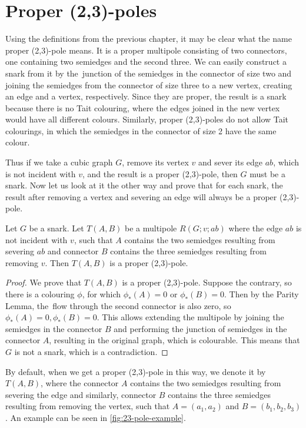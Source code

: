 \section{Proper (2,3)-poles}\label{ch:proper-23-poles}

Using the definitions from the previous chapter, it may be clear what the name proper (2,3)-pole means. It is a proper multipole consisting of two connectors, one containing two semiedges and the second three. We can easily construct a snark from it by the~junction of the semiedges in the connector of size two and joining the semiedges from the connector of size three to a new vertex, creating an edge and a vertex, respectively. Since they are proper, the result is a snark because there is no Tait colouring, where the edges joined in the new vertex would have all different colours. Similarly, proper (2,3)-poles do not allow Tait colourings, in which the semiedges in the connector of size 2 have the same colour.

Thus if we take a cubic graph $G$, remove its vertex $v$ and sever its edge $ab$, which is not incident with $v$, and the result is a proper (2,3)-pole, then $G$ must be a snark. Now let us look at it the other way and prove that for each snark, the result after removing a vertex and severing an edge will always be a proper (2,3)-pole.

\begin{lemma}
	Let $G$ be a snark. Let $T(A,B)$ be a multipole $R(G;v;ab)$ where the edge $ab$ is not incident with $v$, such that $A$ contains the two semiedges resulting from severing $ab$ and connector $B$ contains the three semiedges resulting from removing $v$. Then $T(A,B)$ is a proper (2,3)-pole.
\end{lemma}

\begin{proof}
	We prove that $T(A,B)$ is a proper (2,3)-pole. Suppose the contrary, so there is a colouring $\phi$, for which $\phi_*(A)=0$ or $\phi_*(B)=0$. Then by the Parity Lemma, the~flow through the second connector is also zero, so $\phi_*(A)=0, \phi_*(B)=0$. This allows extending the multipole by joining the semiedges in the connector $B$ and performing the junction of semiedges in the connector $A$, resulting in the original graph, which is colourable. This means that $G$ is not a snark, which is a contradiction.
\end{proof}

By default, when we get a proper (2,3)-pole in this way, we denote it by $T(A,B)$, where the connector $A$ contains the two semiedges resulting from severing the edge and similarly, connector $B$ contains the three semiedges resulting from removing the vertex, such that $A=(a_1,a_2)$ and $B=(b_1,b_2,b_3)$. An example can be seen in \cref{fig:23-pole-example}.

